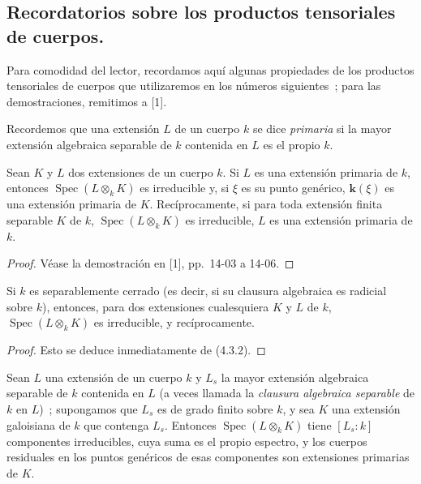\subsection{Recordatorios sobre los productos tensoriales de cuerpos.}
\label{subsection:IV.2.4.3-fr}

Para comodidad del lector, recordamos aquí algunas propiedades de los
productos tensoriales de cuerpos que utilizaremos en los números siguientes~;
para las demostraciones, remitimos a [1].

\begin{env}[4.3.1]
\label{IV.2.4.3.1-fr}
Recordemos que una extensión $L$ de un cuerpo $k$ se dice \emph{primaria} si la
mayor extensión algebraica separable de $k$ contenida en $L$ es el propio
$k$.
\end{env}

\begin{proposition}[4.3.2]
\label{IV.2.4.3.2-fr}
Sean $K$ y $L$ dos extensiones de un cuerpo $k$. Si $L$ es una extensión
primaria de $k$, entonces $\operatorname{Spec}(L\otimes_k K)$ es irreducible
y, si $\xi$ es su punto genérico, $\boldsymbol{k}(\xi)$ es una extensión primaria de $K$.
Recíprocamente, si para toda extensión finita separable $K$ de $k$,
$\operatorname{Spec}(L\otimes_k K)$ es irreducible, $L$ es una extensión
primaria de $k$.
\end{proposition}

\begin{proof}
Véase la demostración en [1], pp.~14-03 a 14-06.
\end{proof}

\begin{corollary}[4.3.3]
\label{IV.2.4.3.3-fr}
Si $k$ es separablemente cerrado \textup{(es decir,} si su clausura algebraica es
radicial sobre $k$\textup{)}, entonces, para dos extensiones cualesquiera $K$ y $L$ de
$k$, $\operatorname{Spec}(L\otimes_k K)$ es irreducible, y recíprocamente.
\end{corollary}

\begin{proof}
Esto se deduce inmediatamente de (4.3.2).
\end{proof}

\begin{corollary}[4.3.4]
\label{IV.2.4.3.4-fr}
Sean $L$ una extensión de un cuerpo $k$ y $L_s$ la mayor extensión algebraica
separable de $k$ contenida en $L$ \textup{(a veces llamada la \emph{clausura algebraica separable}
de $k$ en $L$)}~; supongamos que $L_s$ es de grado finito sobre $k$, y sea $K$
una extensión galoisiana de $k$ que contenga $L_s$. Entonces
$\operatorname{Spec}(L\otimes_k K)$ tiene $[L_s:k]$ componentes irreducibles,
cuya suma es el propio espectro, y los cuerpos residuales en los puntos
genéricos de esas componentes son extensiones primarias de $K$.
\end{corollary}

